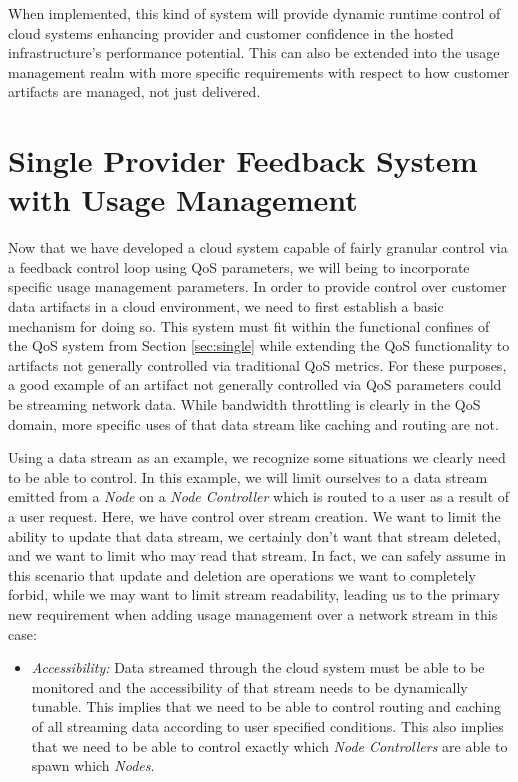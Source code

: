 \documentclass[times, 10pt,twocolumn]{article}
\begin{document}
When implemented, this kind of system will provide dynamic runtime control of cloud systems enhancing provider and customer confidence in the hosted infrastructure's performance potential.  This can also be extended into the usage management realm with more specific requirements with respect to how customer artifacts are managed, not just delivered.

\section{Single Provider Feedback System with Usage Management}\label{sec:singleUm}
Now that we have developed a cloud system capable of fairly granular control via a feedback control loop using QoS parameters, we will being to incorporate specific usage management parameters.  In order to provide control over customer data artifacts in a cloud environment, we need to first establish a basic mechanism for doing so.  This system must fit within the functional confines of the QoS system from Section \ref{sec:single} while extending the QoS functionality to artifacts not generally controlled via traditional QoS metrics.  For these purposes, a good example of an artifact not generally controlled via QoS parameters could be streaming network data.  While bandwidth throttling is clearly in the QoS domain, more specific uses of that data stream like caching and routing are not.   

Using a data stream as an example, we recognize some situations we clearly need to be able to control.  In this example, we will limit ourselves to a data stream emitted from a \textit{Node} on a \textit{Node Controller} which is routed to a user as a result of a user request.  Here, we have control over stream creation.  We want to limit the ability to update that data stream, we certainly don't want that stream deleted, and we want to limit who may read that stream.  In fact, we can safely assume in this scenario that update and deletion are operations we want to completely forbid, while we may want to limit stream readability, leading us to the primary new requirement when adding usage management over a network stream in this case:

\begin{itemize}
\item \textit{Accessibility:} Data streamed through the cloud system must be able to be monitored and the accessibility of that stream needs to be dynamically tunable.  This implies that we need to be able to control routing and caching of all streaming data according to user specified conditions.  This also implies that we need to be able to control exactly which \textit{Node Controllers} are able to spawn which \textit{Nodes}.
\end{itemize}
\end{document}
